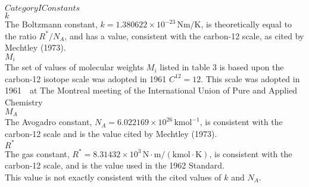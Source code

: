 \documentclass{article}
\begin{document}
$Category I Constants$\\

$k$\\
The Boltzmann constant, $k = 1.380622 \times 10^{-23} \, \mathrm{Nm/K}$, is theoretically equal to the ratio ${R^*}/{N_A}$, and has a value, consistent with the carbon-12 scale, as cited by Mechtley (1973).\\

$M_i$\\
The set of values of molecular weights $M_i$ listed in table 3 is based upon the carbon-12 isotope scale was adopted in 1961 $C^{12} = 12$. This scale was adopted in 1961　at The Montreal meeting of the International Union of Pure and Applied Chemistry\\

$M_A$\\
The Avogadro constant, $N_A = 6.022169 \times 10^{26} \, \mathrm{kmol}^{-1}$, is consistent with the carbon-12 scale and is the value cited by Mechtley (1973).\\

$R^{*}$\\
The gas constant, $R^* = 8.31432 \times 10^{3} \, \mathrm{N \cdot m / (kmol \cdot K)}$, is consistent with the carbon-12 scale, and is the value used in the 1962 Standard.\\This value is not exactly consistent with the cited values of $k$ and $N_A$.\\
\end{document}
